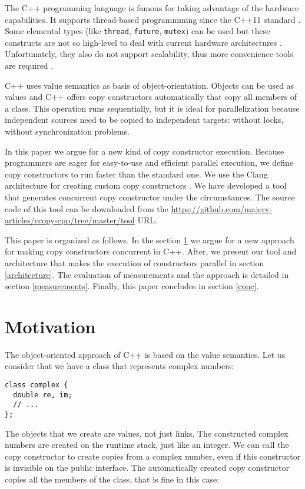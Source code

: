 \documentclass{article}
\begin{document}
The C++ programming language is famous for taking advantage of the hardware capabilities. It
supports thread-based programmming since the C++11 standard \cite{batty:math}. Some elemental
types (like \texttt{thread}, \texttt{future}, \texttt{mutex}) can be used but these constructs
are not so high-level to deal with current hardware architectures \cite{stroustrup:cpp}.
Unfortunately, they also do not support scalability, thus more convenience tools are
required \cite{lupin:fastflow,lupin:multicore,lupin:stl}.

C++ uses value semantics as basis of object-orientation. Objects can be used as values and C++
offers copy constructors automatically that copy all members of a class. This operation runs
sequentially, but it is ideal for parallelization because independent sources need to be copied
to independent targets: without locks, without synchronization problems.

In this paper we argue for a new kind of copy constructor execution. Because programmers are eager
for easy-to-use and efficient parallel execution, we define copy constructors to run faster than
the standard one. We use the Clang architecture for creating custom copy constructors \cite{lattner:clang}.
We have developed a tool that generates concurrent copy constructor under the circumstances.
The source code of this tool can be downloaded from the
\url{https://github.com/majerv-articles/ccopy-cpp/tree/master/tool} URL.

This paper is organized as follows. In the section \ref{motivation} we argue for a new approach
for making copy constructors concurrent in C++. After, we present our tool and architecture that
makes the execution of constructors parallel in section \ref{architecture}. The evaluation of
measurements and the approach is detailed in section \ref{measurements}. Finally, this paper
concludes in section \ref{conc}.

\section{Motivation}
\label{motivation}

The object-oriented approach of C++ is based on the value semantics. Let us consider that we
have a class that represents complex numbers:

\begin{verbatim}
class complex {
  double re, im;
  // ...
};
\end{verbatim}

The objects that we create are values, not just links. The constructed complex numbers are
created on the runtime stack, just like an integer. We can call the copy constructor to
create copies from a complex number, even if this constructor is invisible on the public
interface. The automatically created copy constructor copies all the members of the class,
that is fine in this case:
\end{document}
